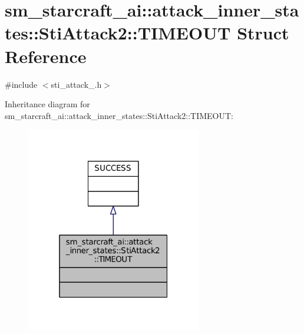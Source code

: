 \hypertarget{structsm__starcraft__ai_1_1attack__inner__states_1_1StiAttack2_1_1TIMEOUT}{}\section{sm\+\_\+starcraft\+\_\+ai\+:\+:attack\+\_\+inner\+\_\+states\+:\+:Sti\+Attack2\+:\+:T\+I\+M\+E\+O\+UT Struct Reference}
\label{structsm__starcraft__ai_1_1attack__inner__states_1_1StiAttack2_1_1TIMEOUT}


{\ttfamily \#include $<$sti\+\_\+attack\+\_.\+h$>$}



Inheritance diagram for sm\+\_\+starcraft\+\_\+ai\+:\+:attack\+\_\+inner\+\_\+states\+:\+:Sti\+Attack2\+:\+:T\+I\+M\+E\+O\+UT\+:
\nopagebreak
\begin{figure}[H]
\begin{center}
\leavevmode
\includegraphics[width=217pt]{structsm__starcraft__ai_1_1attack__inner__states_1_1StiAttack2_1_1TIMEOUT__inherit__graph}
\end{center}
\end{figure}


